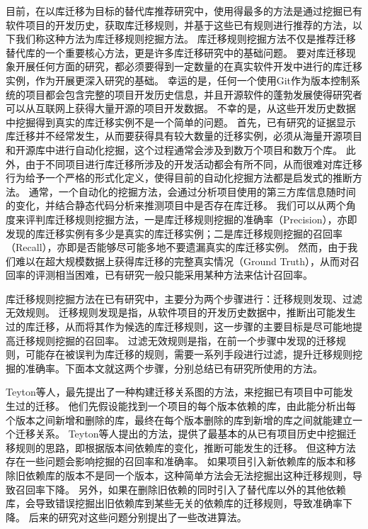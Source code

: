 \documentclass[UTF8]{ctexart}
\begin{document}
目前，在以库迁移为目标的替代库推荐研究中，使用得最多的方法是通过挖掘已有软件项目的开发历史，获取库迁移规则，并基于这些已有规则进行推荐的方法，以下我们称这种方法为库迁移规则挖掘方法。
库迁移规则挖掘方法不仅是推荐迁移替代库的一个重要核心方法，更是许多库迁移研究中的基础问题。
要对库迁移现象开展任何方面的研究，都必须要得到一定数量的在真实软件开发中进行的库迁移实例，作为开展更深入研究的基础。
幸运的是，任何一个使用Git作为版本控制系统的项目都会包含完整的项目开发历史信息，并且开源软件的蓬勃发展使得研究者可以从互联网上获得大量开源的项目开发数据。
不幸的是，从这些开发历史数据中挖掘得到真实的库迁移实例不是一个简单的问题。
首先，已有研究的证据显示库迁移并不经常发生\cite{2012WCRE-Teyton-Mining, 2014JournalOfSysAndSoft-Teyton-Study}，从而要获得具有较大数量的迁移实例，必须从海量开源项目和开源库中进行自动化挖掘，这个过程通常会涉及到数万个项目和数万个库。
此外，由于不同项目进行库迁移所涉及的开发活动都会有所不同，从而很难对库迁移行为给予一个严格的形式化定义，使得目前的自动化挖掘方法都是启发式的推断方法。
通常，一个自动化的挖掘方法，会通过分析项目使用的第三方库信息随时间的变化，并结合静态代码分析来推测项目中是否存在库迁移。
我们可以从两个角度来评判库迁移规则挖掘方法，一是库迁移规则挖掘的准确率（Precision），亦即发现的库迁移实例有多少是真实的库迁移实例；二是库迁移规则挖掘的召回率（Recall），亦即是否能够尽可能多地不要遗漏真实的库迁移实例。
然而，由于我们难以在超大规模数据上获得库迁移的完整真实情况（Ground Truth），从而对召回率的评测相当困难，已有研究一般只能采用某种方法来估计召回率。


库迁移规则挖掘方法在已有研究中，主要分为两个步骤进行：迁移规则发现、过滤无效规则。
迁移规则发现是指，从软件项目的开发历史数据中，推断出可能发生过的库迁移，从而将其作为候选的库迁移规则，这一步骤的主要目标是尽可能地提高迁移规则挖掘的召回率。
过滤无效规则是指，在前一个步骤中发现的迁移规则，可能存在被误判为库迁移的规则，需要一系列手段进行过滤，提升迁移规则挖掘的准确率。下面本文就这两个步骤，分别总结已有研究所使用的方法。

Teyton\cite{2012WCRE-Teyton-Mining}等人，最先提出了一种构建迁移关系图的方法，来挖掘已有项目中可能发生过的迁移。
他们先假设能找到一个项目的每个版本依赖的库，由此能分析出每个版本之间新增和删除的库，最终在每个版本删除的库到新增的库之间就能建立一个迁移关系。
Teyton等人提出的方法，提供了最基本的从已有项目历史中挖掘迁移规则的思路，即根据版本间依赖库的变化，推断可能发生的迁移。
但这种方法存在一些问题会影响挖掘的召回率和准确率。
如果项目引入新依赖库的版本和移除旧依赖库的版本不是同一个版本，这种简单方法会无法挖掘出这种迁移规则，导致召回率下降。
另外，如果在删除旧依赖的同时引入了替代库以外的其他依赖库，会导致错误挖掘出旧依赖库到某些无关的依赖库的迁移规则，导致准确率下降。
后来的研究对这些问题分别提出了一些改进算法。
\end{document}
